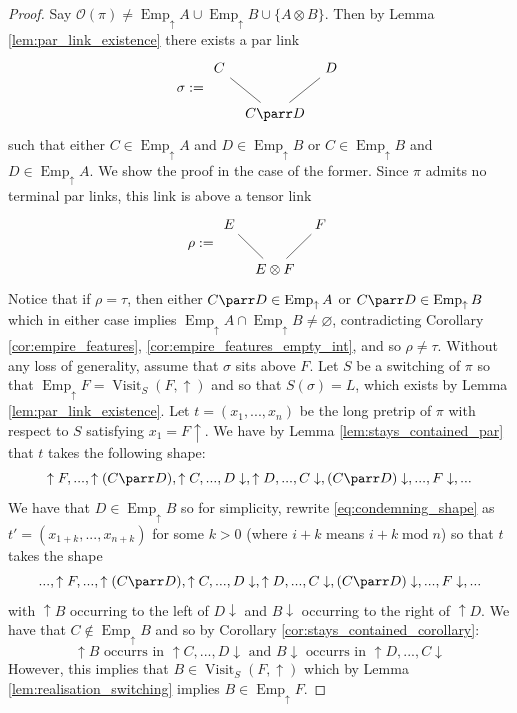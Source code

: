 \documentclass[12pt]{article}
\theoremstyle{plain}
\theoremstyle{definition}
\newcommand{\call}[1]{\mathcal{#1}}
\begin{document}
\begin{proof}
Say $\call{O}(\pi) \neq \operatorname{Emp}_{\uparrow}A \cup \operatorname{Emp}_{\uparrow}B \cup \lbrace A \otimes B\rbrace$. Then by Lemma \ref{lem:par_link_existence} there exists a par link
\[
\sigma := \begin{tikzcd}[column sep = tiny]
C\arrow[dr,dash] && D\arrow[dl,dash]\\
& C \parr D
\end{tikzcd}
\]
such that either $C \in \operatorname{Emp}_{\uparrow}A$ and $D \in \operatorname{Emp}_{\uparrow}B$ or $C \in \operatorname{Emp}_{\uparrow}B$ and $D \in \operatorname{Emp}_{\uparrow}A$. We show the proof in the case of the former. Since $\pi$ admits no terminal par links, this link is above a tensor link
\[
\rho := \begin{tikzcd}[column sep = tiny]
E\arrow[dr,dash] && F\arrow[dl,dash]\\
& E \otimes F
\end{tikzcd}
\]
Notice that if $\rho = \tau$, then either $C \parr D \in \operatorname{Emp}_{\uparrow}A$ or $C \parr D \in \operatorname{Emp}_{\uparrow}B$ which in either case implies $\operatorname{Emp}_{\uparrow}A \cap \operatorname{Emp}_{\uparrow}B \neq \varnothing$, contradicting Corollary \ref{cor:empire_features}, \ref{cor:empire_features_empty_int}, and so $\rho \neq \tau$. Without any loss of generality, assume that $\sigma$ sits above $F$. Let $S$ be a switching of $\pi$ so that $\operatorname{Emp}_{\uparrow}F = \operatorname{Visit}_S(F,\uparrow)$ and so that $S(\sigma) = L$, which exists by Lemma \ref{lem:par_link_existence}. Let $t = (x_1,...,x_n)$ be the long pretrip of $\pi$ with respect to $S$ satisfying $x_1 = F\uparrow$. We have by Lemma \ref{lem:stays_contained_par} that $t$ takes the following shape:
\begin{equation}\label{eq:condemning_shape}
    \uparrow F, ..., \uparrow(C \parr D), \uparrow C, ..., D\downarrow, \uparrow D, ..., C\downarrow, (C \parr D)\downarrow, ..., F\downarrow,...
\end{equation}
We have that $D \in \operatorname{Emp}_{\uparrow}B$ so for simplicity, rewrite \eqref{eq:condemning_shape} as $t' = (x_{1 + k},...,x_{n+k})$ for some $k > 0$ (where $i + k$ means $i + k\operatorname{mod} n$) so that $t$ takes the shape
\begin{equation}\label{eq:condemning_shape_altered}
     ..., \uparrow F, ..., \uparrow(C \parr D), \uparrow C, ..., D\downarrow, \uparrow D, ..., C\downarrow, (C \parr D)\downarrow, ..., F\downarrow,...
\end{equation}
with $\uparrow B$ occurring to the left of $D \downarrow$ and $B \downarrow$ occurring to the right of $\uparrow D$.
We have that $C \not\in \operatorname{Emp}_{\uparrow}B$ and so by Corollary \ref{cor:stays_contained_corollary}:
\begin{equation}
\uparrow B \text{ occurrs in }\uparrow C,..., D\downarrow\text{ and } B\downarrow\text{ occurrs in }\uparrow D, ..., C\downarrow
\end{equation}
However, this implies that $B \in \operatorname{Visit}_S(F,\uparrow)$ which by Lemma \ref{lem:realisation_switching} implies $B \in \operatorname{Emp}_{\uparrow}F$.


\end{proof}
\end{document}

